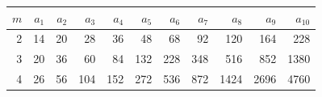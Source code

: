 \begin{tabular}{rrrrrrrrrrr}\toprule $m$ & $a_1$ & $a_2$ & $a_3$ & $a_4$ & $a_5$ & $a_6$ & $a_7$ & $a_8$ & $a_9$ & $a_{10}$\\\midrule
2 & 14 & 20 & 28 & 36 & 48 & 68 & 92 & 120 & 164 & 228\\
3 & 20 & 36 & 60 & 84 & 132 & 228 & 348 & 516 & 852 & 1380\\
4 & 26 & 56 & 104 & 152 & 272 & 536 & 872 & 1424 & 2696 & 4760\\
\bottomrule\end{tabular}
